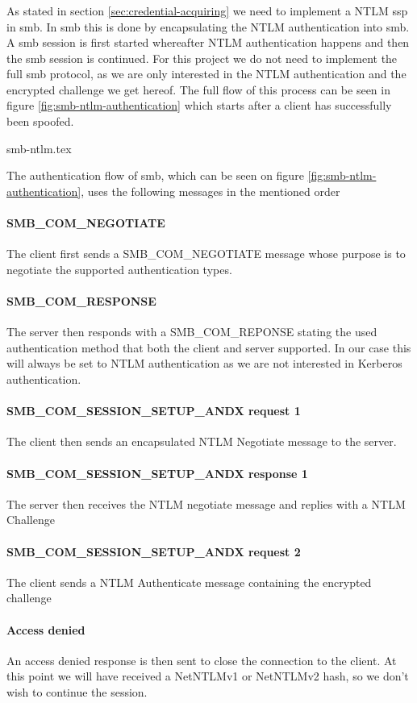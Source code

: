 \documentclass{article}
\begin{document}
\subsubsection{}
As stated in section \ref{sec:credential-acquiring} we need to implement a NTLM \gls{ssp} in \gls{smb}. In \gls{smb} this is done by encapsulating the NTLM authentication into \gls{smb}.
A \gls{smb} session is first started whereafter NTLM authentication happens and then the \gls{smb} session is continued. For this project we do not need to implement the full \gls{smb} protocol, as we are only interested in the NTLM authentication and the encrypted challenge we get hereof. The full flow of this process can be seen in figure \ref{fig:smb-ntlm-authentication} which starts after a client has successfully been spoofed.

{smb-ntlm.tex}

The authentication flow of \gls{smb}, which can be seen on figure \ref{fig:smb-ntlm-authentication}, uses the following messages in the mentioned order
\paragraph{SMB\_COM\_NEGOTIATE} The client first sends a SMB\_COM\_NEGOTIATE message whose purpose is to negotiate the supported authentication types.
\paragraph{SMB\_COM\_RESPONSE} The server then responds with a SMB\_COM\_REPONSE stating the used authentication method that both the client and server supported. In our case this will always be set to NTLM authentication as we are not interested in Kerberos authentication.
\paragraph{SMB\_COM\_SESSION\_SETUP\_ANDX request 1} The client then sends an encapsulated NTLM Negotiate message to the server.
\paragraph{SMB\_COM\_SESSION\_SETUP\_ANDX response 1} The server then receives the NTLM negotiate message and replies with a NTLM Challenge
\paragraph{SMB\_COM\_SESSION\_SETUP\_ANDX request 2} The client sends a NTLM Authenticate message containing the encrypted challenge
\paragraph{Access denied} An access denied response is then sent to close the connection to the client. At this point we will have received a NetNTLMv1 or NetNTLMv2 hash, so we don't wish to continue the session.

\end{document}
